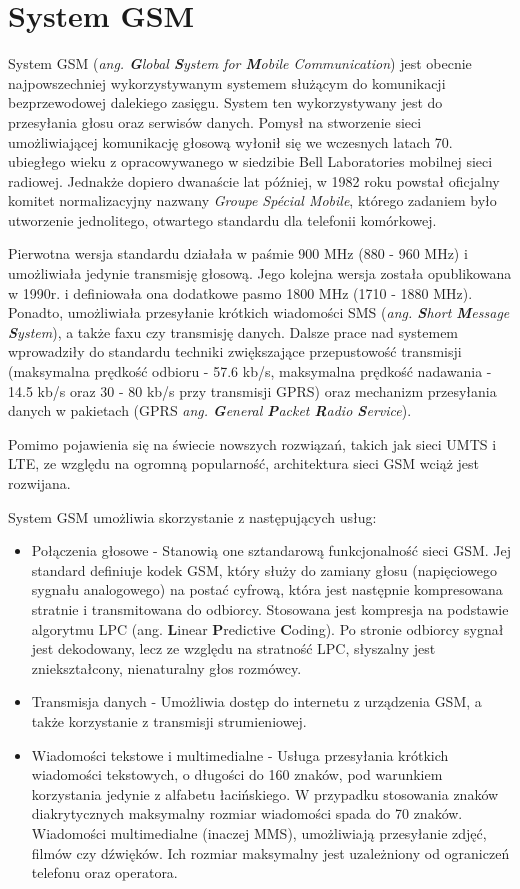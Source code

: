 \section{System GSM}
\label{GSM}

System GSM (\textit{ang. \textbf{G}lobal \textbf{S}ystem for \textbf{M}obile Communication}) jest obecnie najpowszechniej wykorzystywanym systemem służącym do komunikacji bezprzewodowej dalekiego zasięgu. System ten wykorzystywany jest do przesyłania głosu oraz serwisów danych. Pomysł na stworzenie sieci umożliwiającej komunikację głosową wyłonił się we wczesnych latach 70. ubiegłego wieku z opracowywanego w siedzibie Bell Laboratories mobilnej sieci radiowej. Jednakże dopiero dwanaście lat później, w 1982 roku powstał oficjalny komitet normalizacyjny nazwany \textit{Groupe Spécial Mobile}, którego zadaniem było utworzenie jednolitego, otwartego standardu dla telefonii komórkowej. 

Pierwotna wersja standardu działała w paśmie 900 MHz (880 - 960 MHz) i umożliwiała jedynie transmisję głosową. Jego kolejna wersja została opublikowana w 1990r. i definiowała ona dodatkowe pasmo 1800 MHz (1710 - 1880 MHz). Ponadto, umożliwiała przesyłanie krótkich wiadomości SMS (\textit{ang. \textbf{S}hort \textbf{M}essage \textbf{S}ystem}), a także faxu czy transmisję danych. Dalsze prace nad systemem wprowadziły do standardu techniki zwiększające przepustowość transmisji (maksymalna prędkość odbioru - 57.6 kb/s, maksymalna prędkość nadawania - 14.5 kb/s oraz 30 - 80 kb/s przy transmisji GPRS) oraz mechanizm przesyłania danych w pakietach (GPRS \textit{ang. \textbf{G}eneral \textbf{P}acket \textbf{R}adio \textbf{S}ervice}). 

Pomimo pojawienia się na świecie nowszych rozwiązań, takich jak sieci UMTS i LTE, ze względu na ogromną popularność, architektura sieci GSM wciąż jest rozwijana. 

System GSM umożliwia skorzystanie z następujących usług:
\begin{itemize}
	\item Połączenia głosowe - Stanowią one sztandarową funkcjonalność sieci GSM. Jej standard definiuje kodek GSM, który służy do zamiany głosu (napięciowego sygnału analogowego) na postać cyfrową, która jest następnie kompresowana stratnie i transmitowana do odbiorcy. Stosowana jest kompresja na podstawie algorytmu LPC (ang. \textbf{L}inear \textbf{P}redictive \textbf{C}oding). Po stronie odbiorcy sygnał jest dekodowany, lecz ze względu na stratność LPC, słyszalny jest zniekształcony, nienaturalny głos rozmówcy.
	\item Transmisja danych - Umożliwia dostęp do internetu z urządzenia GSM, a także korzystanie z transmisji strumieniowej.
	\item Wiadomości tekstowe i multimedialne - Usługa przesyłania krótkich wiadomości tekstowych, o długości do 160 znaków, pod warunkiem korzystania jedynie z alfabetu łacińskiego. W przypadku stosowania znaków diakrytycznych maksymalny rozmiar wiadomości spada do 70 znaków. Wiadomości multimedialne (inaczej MMS), umożliwiają przesyłanie zdjęć, filmów czy dźwięków. Ich rozmiar maksymalny jest uzależniony od ograniczeń telefonu oraz operatora.
\end{itemize}

